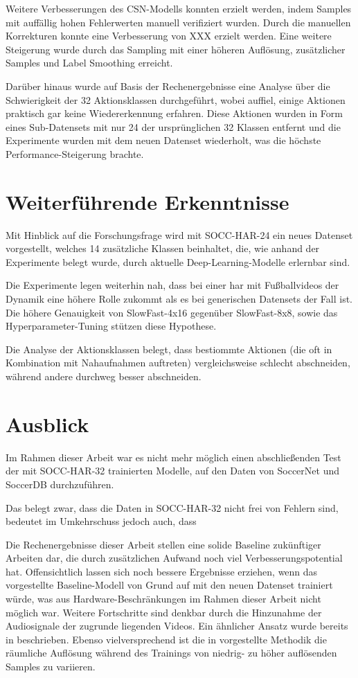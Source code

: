 Weitere Verbesserungen des CSN-Modells konnten erzielt werden, indem Samples mit auffällig hohen Fehlerwerten manuell verifiziert wurden.
Durch die manuellen Korrekturen konnte eine Verbesserung von XXX erzielt werden.
Eine weitere Steigerung wurde durch das Sampling mit einer höheren Auflösung, zusätzlicher Samples und Label Smoothing erreicht.

Darüber hinaus wurde auf Basis der Rechenergebnisse eine Analyse über die Schwierigkeit der 32 Aktionsklassen durchgeführt, wobei auffiel, einige Aktionen praktisch gar keine Wiedererkennung erfahren.
Diese Aktionen wurden in Form eines Sub-Datensets mit nur 24 der ursprünglichen 32 Klassen entfernt und die Experimente wurden mit dem neuen Datenset wiederholt, was die höchste Performance-Steigerung brachte.

\section{Weiterführende Erkenntnisse}
\label{sec:weiterfuhrende-erkenntnisse}

Mit Hinblick auf die Forschungsfrage wird mit SOCC-HAR-24 ein neues Datenset vorgestellt, welches 14 zusätzliche Klassen beinhaltet, die, wie anhand der Experimente belegt wurde, durch aktuelle Deep-Learning-Modelle erlernbar sind.

Die Experimente legen weiterhin nah, dass bei einer \gls{har} mit Fußballvideos der Dynamik eine höhere Rolle zukommt als es bei generischen Datensets der Fall ist.
Die höhere Genauigkeit von SlowFast-4x16 gegenüber SlowFast-8x8, sowie das Hyperparameter-Tuning stützen diese Hypothese.

Die Analyse der Aktionsklassen belegt, dass bestiommte Aktionen (die \zB oft in Kombination mit Nahaufnahmen auftreten) vergleichsweise schlecht abschneiden, während andere durchweg besser abschneiden.

\section{Ausblick}
\label{sec:ausblick}

Im Rahmen dieser Arbeit war es nicht mehr möglich einen abschließenden Test der mit SOCC-HAR-32 trainierten Modelle, auf den Daten von SoccerNet und SoccerDB durchzuführen.


Das belegt zwar, dass die Daten in SOCC-HAR-32 nicht frei von Fehlern sind, bedeutet im Umkehrschuss jedoch auch, dass

Die Rechenergebnisse dieser Arbeit stellen eine solide Baseline zukünftiger Arbeiten dar, die durch zusätzlichen Aufwand noch viel Verbesserungspotential hat.
Offensichtlich lassen sich noch bessere Ergebnisse erziehen, wenn das vorgestellte Baseline-Modell von Grund auf mit den neuen Datenset trainiert würde, was aus Hardware-Beschränkungen im Rahmen dieser Arbeit nicht möglich war.
Weitere Fortschritte sind denkbar durch die Hinzunahme der Audiosignale der zugrunde liegenden Videos.
Ein ähnlicher Ansatz wurde bereits in \cite{Wang19} beschrieben.
Ebenso vielversprechend ist die in \cite{Wu20} vorgestellte Methodik die räumliche Auflösung während des Trainings von niedrig- zu höher auflösenden Samples zu variieren.

